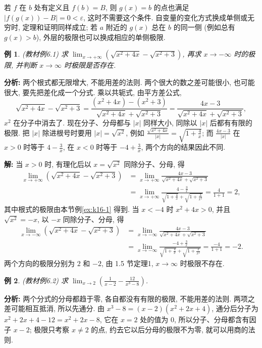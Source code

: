 \documentclass[UTF8,openany]{ctexbook}
\theoremstyle{chinesetextbook}
\newtheorem{example}{例}[section]
\newenvironment{cnsolution}{\par\indent\textbf{解:} \ignorespaces}{\par}
\begin{document}
若 $f$ 在 $b$ 处有定义且 $f(b)=B$, 则 $g(x)=b$ 的点也满足 $|f(g(x))-B|=0<\varepsilon$, 这时不需要这个条件. 自变量的变化方式换成单侧或无穷时, 定理和证明同样成立; 若 $a$ 附近的 $g(x)$ 总在 $b$ 的同一侧 (例如总有 $g(x)>b$), 外层的极限也可以换成相应的单侧极限.
\begin{example}
\textnormal{(教材例6.1)} 求 $\displaystyle\lim_{x\to+\infty}\left(\sqrt{x^2+4x}-\sqrt{x^2+3}\right)$, 再求 $x\to-\infty$ 时的极限, 并判断 $x\to\infty$ 时极限是否存在.
\end{example}
\par\indent\textbf{分析:} 两个根式都无限增大, 不能用差的法则. 两个很大的数之差可能很小, 也可能很大, 要先把差化成一个分式. 乘以共轭式, 由平方差公式,
\[
\sqrt{x^2+4x}-\sqrt{x^2+3}=\frac{(x^2+4x)-(x^2+3)}{\sqrt{x^2+4x}+\sqrt{x^2+3}}=\frac{4x-3}{\sqrt{x^2+4x}+\sqrt{x^2+3}},
\]
$x^2$ 在分子中消去了. 现在分子、分母都与 $|x|$ 同样大小, 同除以 $|x|$ 后都有有限的极限. 把 $|x|$ 除进根号时要用 $|x|=\sqrt{x^2}$, 例如 $\displaystyle\frac{\sqrt{x^2+4x}}{|x|}=\sqrt{1+\frac4x}$; 而 $\displaystyle\frac{4x-3}{|x|}$ 在 $x>0$ 时等于 $\displaystyle4-\frac3x$, 在 $x<0$ 时等于 $\displaystyle-4+\frac3x$, 两个方向的结果因此不同.
\begin{cnsolution}
当 $x>0$ 时, 有理化后以 $x=\sqrt{x^2}$ 同除分子、分母, 得
\[
\begin{aligned}
\lim_{x\to+\infty}\left(\sqrt{x^2+4x}-\sqrt{x^2+3}\right)
&=\lim_{x\to+\infty}\frac{4x-3}{\sqrt{x^2+4x}+\sqrt{x^2+3}}\\
&=\lim_{x\to+\infty}\frac{4-\frac3x}{\sqrt{1+\frac4x}+\sqrt{1+\frac3{x^2}}}=\frac4{1+1}=2,
\end{aligned}
\]
其中根式的极限由本节例\ref{ex:k16-1} 得到. 当 $x<-4$ 时 $x^2+4x>0$, 并且 $\sqrt{x^2}=-x$, 以 $-x$ 同除分子、分母, 得
\[
\begin{aligned}
\lim_{x\to-\infty}\left(\sqrt{x^2+4x}-\sqrt{x^2+3}\right)
&=\lim_{x\to-\infty}\frac{4x-3}{\sqrt{x^2+4x}+\sqrt{x^2+3}}\\
&=\lim_{x\to-\infty}\frac{-4+\frac3x}{\sqrt{1+\frac4x}+\sqrt{1+\frac3{x^2}}}=\frac{-4}{1+1}=-2.
\end{aligned}
\]
两个方向的极限分别为 $2$ 和 $-2$, 由 1.5 节定理1, $x\to\infty$ 时极限不存在.
\end{cnsolution}
\begin{example}\label{ex:6-2}
\textnormal{(教材例6.2)} 求 $\displaystyle\lim_{x\to2}\left(\frac1{x-2}-\frac{12}{x^3-8}\right)$.
\end{example}
\par\indent\textbf{分析:} 两个分式的分母都趋于零, 各自都没有有限的极限, 不能用差的法则. 两项之差可能相互抵消, 所以先通分. 由 $x^3-8=(x-2)(x^2+2x+4)$, 通分后分子为 $x^2+2x+4-12=x^2+2x-8$, 它在 $x=2$ 处的值为 $0$, 所以分子、分母都含有因子 $x-2$; 极限只考察 $x\ne2$ 的点, 约去它以后分母的极限不为零, 就可以用商的法则.
\end{document}
